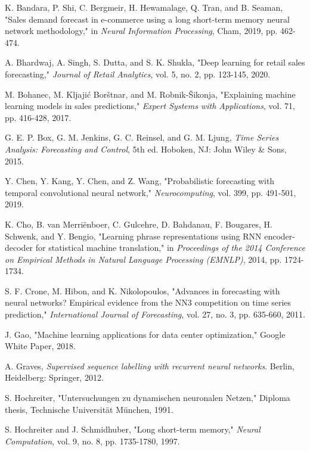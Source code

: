 \documentclass[conference]{IEEEtran}
\begin{document}
\begin{thebibliography}{00}
 K. Bandara, P. Shi, C. Bergmeir, H. Hewamalage, Q. Tran, and B. Seaman, "Sales demand forecast in e-commerce using a long short-term memory neural network methodology," in \textit{Neural Information Processing}, Cham, 2019, pp. 462-474.

 A. Bhardwaj, A. Singh, S. Dutta, and S. K. Shukla, "Deep learning for retail sales forecasting," \textit{Journal of Retail Analytics}, vol. 5, no. 2, pp. 123-145, 2020.

 M. Bohanec, M. Kljajić Borštnar, and M. Robnik-Šikonja, "Explaining machine learning models in sales predictions," \textit{Expert Systems with Applications}, vol. 71, pp. 416-428, 2017.

 G. E. P. Box, G. M. Jenkins, G. C. Reinsel, and G. M. Ljung, \textit{Time Series Analysis: Forecasting and Control}, 5th ed. Hoboken, NJ: John Wiley \& Sons, 2015.

 Y. Chen, Y. Kang, Y. Chen, and Z. Wang, "Probabilistic forecasting with temporal convolutional neural network," \textit{Neurocomputing}, vol. 399, pp. 491-501, 2019.

 K. Cho, B. van Merriënboer, C. Gulcehre, D. Bahdanau, F. Bougares, H. Schwenk, and Y. Bengio, "Learning phrase representations using RNN encoder-decoder for statistical machine translation," in \textit{Proceedings of the 2014 Conference on Empirical Methods in Natural Language Processing (EMNLP)}, 2014, pp. 1724-1734.

 S. F. Crone, M. Hibon, and K. Nikolopoulos, "Advances in forecasting with neural networks? Empirical evidence from the NN3 competition on time series prediction," \textit{International Journal of Forecasting}, vol. 27, no. 3, pp. 635-660, 2011.

 J. Gao, "Machine learning applications for data center optimization," Google White Paper, 2018.

 A. Graves, \textit{Supervised sequence labelling with recurrent neural networks}. Berlin, Heidelberg: Springer, 2012.

 S. Hochreiter, "Untersuchungen zu dynamischen neuronalen Netzen," Diploma thesis, Technische Universität München, 1991.

 S. Hochreiter and J. Schmidhuber, "Long short-term memory," \textit{Neural Computation}, vol. 9, no. 8, pp. 1735-1780, 1997.


\end{thebibliography}
\end{document}
